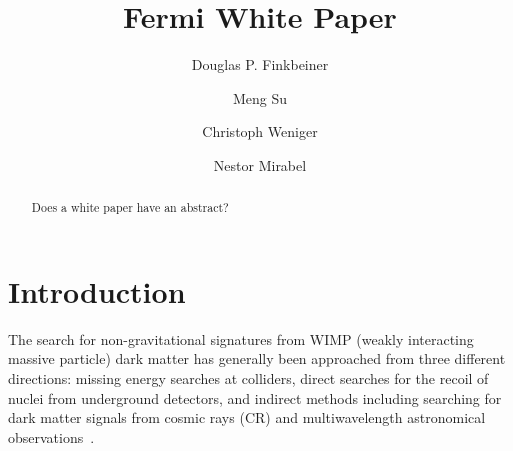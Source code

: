 \documentclass[aps,prd,superscriptaddress,showpacs,nofootinbib,fixlfloat, 12pt]{revtex4-1}
\begin{document}
\title{Fermi White Paper}

\author{Douglas P. Finkbeiner}

\author{Meng Su}

\author{Christoph Weniger}

\author{Nestor Mirabel}

\begin{abstract} Does a white paper have an abstract?
\end{abstract}


\maketitle



\section{Introduction}


The search for non-gravitational signatures from WIMP
(weakly interacting massive particle) dark matter has 
generally been approached from three different directions: missing
energy searches at colliders, direct searches for the
recoil of nuclei from underground detectors, and indirect
methods including searching for dark matter signals from cosmic
rays (CR) and multiwavelength astronomical
observations~\citep{Jungman:1995df, Bergstrom:2000, Bertone:2005, Hooper:2007Review,
2012arXiv1205.4882B, Cirelli:2012tf}.
\end{document}
